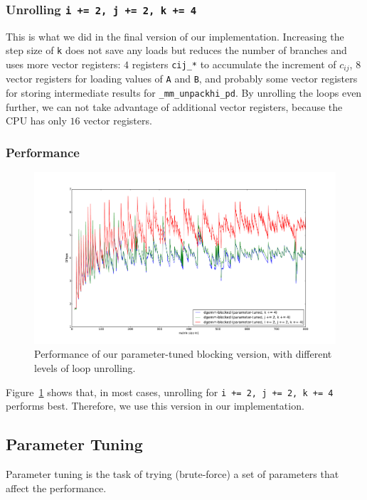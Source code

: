 \documentclass[12pt]{article}
\begin{document}
\subsubsection{Unrolling \lstinline{i += 2, j += 2, k += 4}}
This is what we did in the final version of our implementation. Increasing the step size of \lstinline{k} does not save any loads but reduces the number of branches and uses more vector registers: $4$ registers \lstinline{cij_*} to accumulate the increment of $c_{ij}$, $8$ vector registers for loading values of \lstinline{A} and \lstinline{B}, and probably some vector registers for storing intermediate results for \lstinline{_mm_unpackhi_pd}. By unrolling the loops even further, we can not take advantage of additional vector registers, because the CPU has only $16$ vector registers.

\subsubsection{Performance}
\begin{figure}
	\includegraphics[width=\textwidth]{graphs/profiles/PROFILE_UNROLLING_SSE.pdf}
	\caption{Performance of our parameter-tuned blocking version, with different levels of loop unrolling.}
	\label{fig:sse_opt_graph}
\end{figure}

Figure~\ref{fig:sse_opt_graph} shows that, in most cases, unrolling for \lstinline{i += 2, j += 2, k += 4} performs best. Therefore, we use this version in our implementation.

\subsection{Parameter Tuning}
Parameter tuning is the task of trying (brute-force) a set of parameters that affect the performance.
\end{document}

